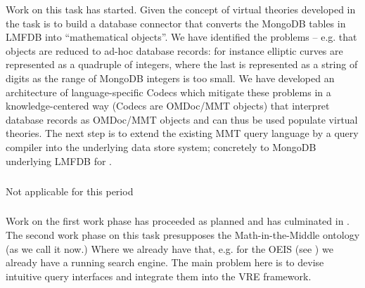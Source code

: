 Work on this task has started. Given the concept of virtual theories developed in  the task is to build a database connector that converts the MongoDB tables in LMFDB into ``mathematical objects''.
We have identified the problems -- e.g. that objects are reduced to ad-hoc database records: for instance elliptic curves are represented as a quadruple of integers, where the last is represented as a string of digits as the range of MongoDB integers is too small.
We have developed an architecture of language-specific Codecs which mitigate these problems in a knowledge-centered way (Codecs are OMDoc/MMT objects) that interpret database records as OMDoc/MMT objects and can thus be used populate virtual theories.
The next step is to extend the existing MMT query language by a query compiler into the underlying data store system; concretely to MongoDB underlying LMFDB for .
\medskip

\subparagraph{}
Not applicable for this period
\medskip

\subparagraph{}

Work on the first work phase has proceeded as planned and has culminated in .
The second work phase on this task presupposes the Math-in-the-Middle ontology (as we call it now.)
Where we already have that, e.g. for the OEIS (see ) we already have a running search engine.
The main problem here is to devise intuitive query interfaces and integrate them into the \pn VRE framework.


